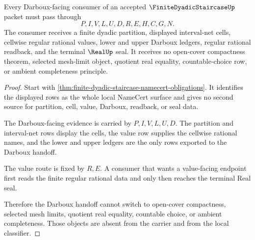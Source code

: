 \begin{theorem}
\label{thm:finite-dyadic-staircase-darboux-handoff}
Every Darboux-facing consumer of an accepted $\FiniteDyadicStaircaseUp$ packet must pass through
$$
P,I,V,L,U,D,R,E,H,C,G,N .
$$
The consumer receives a finite dyadic partition, displayed interval-net cells, cellwise regular rational values, lower and upper Darboux ledgers, regular rational readback, and the terminal $\RealUp$ seal. It receives no open-cover compactness theorem, selected mesh-limit object, quotient real equality, countable-choice row, or ambient completeness principle.
\end{theorem}
\begin{proof}
Start with \autoref{thm:finite-dyadic-staircase-namecert-obligations}. It identifies the displayed rows as the whole local NameCert surface and gives no second source for partition, cell, value, Darboux, readback, or seal data.

The Darboux-facing evidence is carried by $P,I,V,L,U,D$. The partition and interval-net rows display the cells, the value row supplies the cellwise rational names, and the lower and upper ledgers are the only rows exported to the Darboux handoff.

The value route is fixed by $R,E$. A consumer that wants a value-facing endpoint first reads the finite regular rational data and only then reaches the terminal Real seal.

Therefore the Darboux handoff cannot switch to open-cover compactness, selected mesh limits, quotient real equality, countable choice, or ambient completeness. Those objects are absent from the carrier and from the local classifier.
\end{proof}


\begin{closurestatus}{\FiniteDyadicStaircaseUp}
  \theoryclosure{\seedClosure}
  \formalstatus{\unformalizedV}
\end{closurestatus}
